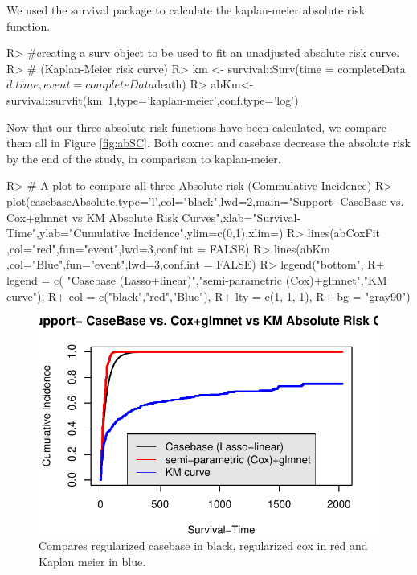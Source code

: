 \documentclass[
]{jss}
\begin{document}
We used the survival package to calculate the kaplan-meier absolute risk
function.

\begin{CodeChunk}

\begin{CodeInput}
R> #creating a surv object to be used to fit an unadjusted absolute risk curve.
R> # (Kaplan-Meier risk curve)
R> km <- survival::Surv(time = completeData$d.time, event = completeData$death)
R> abKm<-survival::survfit(km~1,type='kaplan-meier',conf.type='log')
\end{CodeInput}
\end{CodeChunk}

Now that our three absolute risk functions have been calculated, we
compare them all in Figure \ref{fig:abSC}. Both coxnet and casebase
decrease the absolute risk by the end of the study, in comparison to
kaplan-meier.

\begin{CodeChunk}

\begin{CodeInput}
R> # A plot to compare all three Absolute risk (Commulative Incidence)
R> plot(casebaseAbsolute,type='l',col="black",lwd=2,main="Support- CaseBase vs. Cox+glmnet vs KM Absolute Risk Curves",xlab="Survival-Time",ylab="Cumulative Incidence",ylim=c(0,1),xlim=)
R> lines(abCoxFit ,col="red",fun="event",lwd=3,conf.int = FALSE)
R> lines(abKm ,col="Blue",fun="event",lwd=3,conf.int = FALSE)
R> legend("bottom", 
R+        legend = c( "Casebase (Lasso+linear)","semi-parametric (Cox)+glmnet","KM curve"), 
R+        col = c("black","red","Blue"),
R+        lty = c(1, 1, 1), 
R+        bg = "gray90")
\end{CodeInput}
\begin{figure}

{\centering \includegraphics{../figures/abSupportComparison-1} 

}

\caption{\label{fig:abSC} Compares regularized casebase in black, regularized cox in red and Kaplan meier in blue.}\label{fig:abSupportComparison}
\end{figure}
\end{CodeChunk}
\end{document}
